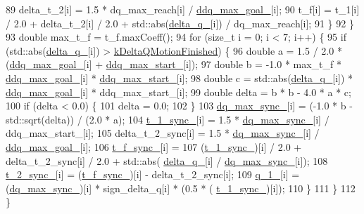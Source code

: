 \begin{DoxyCode}
89       delta\_t\_2[i] = 1.5 * dq\_max\_reach[i] / \hyperlink{classMotionGenerator_afa25b16e5c66c9f23c9869fa992b0bd4}{ddq\_max\_goal\_}[i];
90       t\_f[i] = t\_1[i] / 2.0 + delta\_t\_2[i] / 2.0 + std::abs(\hyperlink{classMotionGenerator_a943798bdc9c985f66548c59d562fd8b7}{delta\_q\_}[i]) / dq\_max\_reach[i];
91     \}
92   \}
93   \textcolor{keywordtype}{double} max\_t\_f = t\_f.maxCoeff();
94   \textcolor{keywordflow}{for} (\textcolor{keywordtype}{size\_t} i = 0; i < 7; i++) \{
95     \textcolor{keywordflow}{if} (std::abs(\hyperlink{classMotionGenerator_a943798bdc9c985f66548c59d562fd8b7}{delta\_q\_}[i]) > \hyperlink{classMotionGenerator_a03e73e0857236b6e3061457bc969efb2}{kDeltaQMotionFinished}) \{
96       \textcolor{keywordtype}{double} a = 1.5 / 2.0 * (\hyperlink{classMotionGenerator_afa25b16e5c66c9f23c9869fa992b0bd4}{ddq\_max\_goal\_}[i] + \hyperlink{classMotionGenerator_aba35338c7023ab218a3c2991a36a79d4}{ddq\_max\_start\_}[i]);
97       \textcolor{keywordtype}{double} b = -1.0 * max\_t\_f * \hyperlink{classMotionGenerator_afa25b16e5c66c9f23c9869fa992b0bd4}{ddq\_max\_goal\_}[i] * \hyperlink{classMotionGenerator_aba35338c7023ab218a3c2991a36a79d4}{ddq\_max\_start\_}[i];
98       \textcolor{keywordtype}{double} c = std::abs(\hyperlink{classMotionGenerator_a943798bdc9c985f66548c59d562fd8b7}{delta\_q\_}[i]) * \hyperlink{classMotionGenerator_afa25b16e5c66c9f23c9869fa992b0bd4}{ddq\_max\_goal\_}[i] * ddq\_max\_start\_[i];
99       \textcolor{keywordtype}{double} delta = b * b - 4.0 * a * c;
100       \textcolor{keywordflow}{if} (delta < 0.0) \{
101         delta = 0.0;
102       \}
103       \hyperlink{classMotionGenerator_a4924578b9275d362c015b16f80232263}{dq\_max\_sync\_}[i] = (-1.0 * b - std::sqrt(delta)) / (2.0 * a);
104       \hyperlink{classMotionGenerator_a0b580a9e6904d925146081c870f76266}{t\_1\_sync\_}[i] = 1.5 * \hyperlink{classMotionGenerator_a4924578b9275d362c015b16f80232263}{dq\_max\_sync\_}[i] / ddq\_max\_start\_[i];
105       delta\_t\_2\_sync[i] = 1.5 * \hyperlink{classMotionGenerator_a4924578b9275d362c015b16f80232263}{dq\_max\_sync\_}[i] / \hyperlink{classMotionGenerator_afa25b16e5c66c9f23c9869fa992b0bd4}{ddq\_max\_goal\_}[i];
106       \hyperlink{classMotionGenerator_a7119bd48c0d8b0f838a3a81e8f52a8b2}{t\_f\_sync\_}[i] =
107           (\hyperlink{classMotionGenerator_a0b580a9e6904d925146081c870f76266}{t\_1\_sync\_})[i] / 2.0 + delta\_t\_2\_sync[i] / 2.0 + std::abs(
      \hyperlink{classMotionGenerator_a943798bdc9c985f66548c59d562fd8b7}{delta\_q\_}[i] / \hyperlink{classMotionGenerator_a4924578b9275d362c015b16f80232263}{dq\_max\_sync\_}[i]);
108       \hyperlink{classMotionGenerator_a5b25974dfd22aefacc286a01211ff93d}{t\_2\_sync\_}[i] = (\hyperlink{classMotionGenerator_a7119bd48c0d8b0f838a3a81e8f52a8b2}{t\_f\_sync\_})[i] - delta\_t\_2\_sync[i];
109       \hyperlink{classMotionGenerator_a9e8620af632e541116e9b5e219f1ccbd}{q\_1\_}[i] = (\hyperlink{classMotionGenerator_a4924578b9275d362c015b16f80232263}{dq\_max\_sync\_})[i] * sign\_delta\_q[i] * (0.5 * (
      \hyperlink{classMotionGenerator_a0b580a9e6904d925146081c870f76266}{t\_1\_sync\_})[i]);
110     \}
111   \}
112 \}
\end{DoxyCode}

